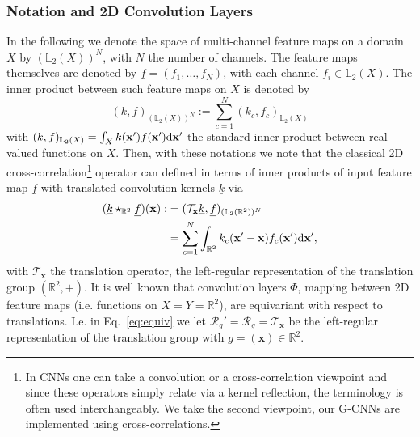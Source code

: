 \documentclass[twocolumn,final]{article}
\begin{document}
\subsubsection{Notation and 2D Convolution Layers}
In the following we denote the space of multi-channel feature maps on a domain $X$ by $(\mathbb{L}_2(X))^{N}$, with $N$ the number of channels. The feature maps themselves are denoted by $\underline{f} = (f_1,\dots,f_{N})$, with each channel $f_i \in \mathbb{L}_2(X)$. The inner product between such feature maps on $X$ is denoted by 
$$
( \underline{k} , \underline{f} )_{(\mathbb{L}_2(X))^{N}}:=\sum_{c=1}^{N}( k_c, f_c )_{\mathbb{L}_2(X)}
$$ with $( k, f )_{\mathbb{L}_2(X)}= \int_X k(\mathbf{x}') f(\mathbf{x}') {\rm d}\mathbf{x}'$ the standard inner product between real-valued functions on $X$.
Then, with these notations we note that the classical 2D cross-correlation\footnote{In CNNs one can take a convolution or a cross-correlation viewpoint and since these operators simply relate via a kernel reflection, the terminology is often used interchangeably. We take the second viewpoint, our G-CNNs are implemented using cross-correlations.} operator can defined in terms of inner products of input feature map $\underline{f}$ with translated convolution kernels $\underline{k}$ via
\begin{align}
\label{eq:2dcorr}
(\underline{k} \star_{\mathbb{R}^2} \underline{f})(\mathbf{x})
:&= (\mathcal{T}_\mathbf{x} \underline{k}, \underline{f})_{(\mathbb{L}_2(\mathbb{R}^2))^{N}} \\
&= \sum_{c=1}^{N}\int_{\mathbb{R}^2} k_c(\mathbf{x}' - \mathbf{x}) f_c(\mathbf{x}') {\rm d}\mathbf{x}',\nonumber
\end{align}
with $\mathcal{T}_\mathbf{x}$ the translation operator, the left-regular representation of the translation group $(\mathbb{R}^2,+)$. It is well known that convolution layers $\Phi$, mapping between 2D feature maps (i.e. functions on $X=Y=\mathbb{R}^2$), are equivariant with respect to translations. I.e. in Eq.~\eqref{eq:equiv} we let $\mathcal{R}_g' = \mathcal{R}_g = \mathcal{T}_\mathbf{x}$ be the left-regular representation of the translation group with $g = (\mathbf{x}) \in \mathbb{R}^2$.
\end{document}
